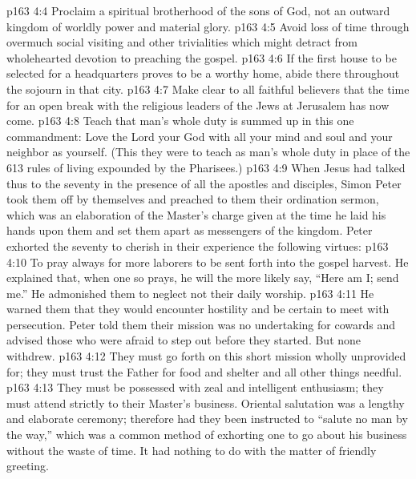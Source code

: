 \pc \vs p163 4:4 \bibnobreakspace Proclaim a spiritual brotherhood of the sons of God, not an outward kingdom of worldly power and material glory.
\pc \vs p163 4:5 \bibnobreakspace Avoid loss of time through overmuch social visiting and other trivialities which might detract from wholehearted devotion to preaching the gospel.
\pc \vs p163 4:6 \bibnobreakspace If the first house to be selected for a headquarters proves to be a worthy home, abide there throughout the sojourn in that city.
\pc \vs p163 4:7 \bibnobreakspace Make clear to all faithful believers that the time for an open break with the religious leaders of the Jews at Jerusalem has now come.
\pc \vs p163 4:8 \bibnobreakspace Teach that man’s whole duty is summed up in this one commandment: Love the Lord your God with all your mind and soul and your neighbor as yourself. (This they were to teach as man’s whole duty in place of the 613 rules of living expounded by the Pharisees.)
\pc \vs p163 4:9 When Jesus had talked thus to the seventy in the presence of all the apostles and disciples, Simon Peter took them off by themselves and preached to them their ordination sermon, which was an elaboration of the Master’s charge given at the time he laid his hands upon them and set them apart as messengers of the kingdom. Peter exhorted the seventy to cherish in their experience the following virtues:
\pc \vs p163 4:10 \bibnobreakspace {} To pray always for more laborers to be sent forth into the gospel harvest. He explained that, when one so prays, he will the more likely say, “Here am I; send me.” He admonished them to neglect not their daily worship.
\pc \vs p163 4:11 \bibnobreakspace {} He warned them that they would encounter hostility and be certain to meet with persecution. Peter told them their mission was no undertaking for cowards and advised those who were afraid to step out before they started. But none withdrew.
\pc \vs p163 4:12 \bibnobreakspace {} They must go forth on this short mission wholly unprovided for; they must trust the Father for food and shelter and all other things needful.
\pc \vs p163 4:13 \bibnobreakspace {} They must be possessed with zeal and intelligent enthusiasm; they must attend strictly to their Master’s business. Oriental salutation was a lengthy and elaborate ceremony; therefore had they been instructed to \textcolor{ubdarkred}{“salute no man by the way,”} which was a common method of exhorting one to go about his business without the waste of time. It had nothing to do with the matter of friendly greeting.
